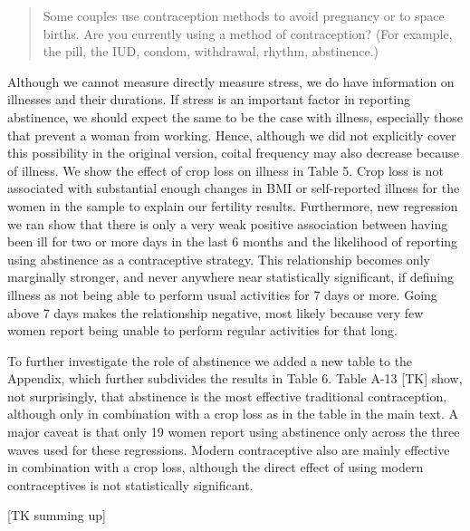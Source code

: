 \documentclass[letterpaper,12pt]{article}
\begin{document}
\begin{enumerate}
\begin{quote}
Some couples use contraception methods to avoid pregnancy or to
space births. Are you currently using a method of contraception?
(For example, the pill, the IUD, condom, withdrawal, rhythm,
abstinence.)
\end{quote}


Although we cannot measure directly measure stress, we do have information 
on illnesses and their durations.
If stress is an important factor in reporting abstinence, we should
expect the same to be the case with illness, especially those that 
prevent a woman from working.
Hence, although we did not explicitly cover this possibility in the original 
version, coital frequency may also decrease because of illness.
We show the effect of crop loss on illness in Table 5.
Crop loss is  not associated with substantial enough changes in BMI or 
self-reported illness for the women in the sample to explain our fertility results.
Furthermore, new regression we ran show that there is only a very weak 
positive association between having been ill for two or more days in the last 
6 months and the likelihood of reporting using abstinence as a contraceptive 
strategy.
This relationship becomes only marginally stronger, and never anywhere near
statistically significant, if defining illness as not being able to
perform usual activities for 7 days or more.
Going above 7 days makes the relationship negative, most likely because
very few women report being unable to perform regular activities for that
long.

To further investigate the role of abstinence we added a new
table to the Appendix, which further subdivides the results in Table 6.
Table A-13 [TK] show, not surprisingly, that abstinence is the most 
effective traditional contraception, although only in combination 
with a crop loss as in the table in the main text.
A major caveat is that only 19 women report using abstinence only
across the three waves used for these regressions.
Modern contraceptive also are mainly effective in combination with
a crop loss, although the direct effect of using modern contraceptives
is not statistically significant.

[TK summing up]







\end{enumerate}
\end{document}
